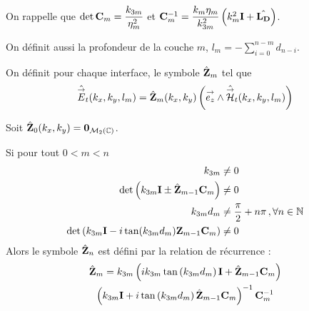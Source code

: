         On rappelle que \(\det{\mathbf{C}_m} = \dfrac{k_{3m}}{\eta_m^2}\) et \(\mathbf{C}_m^{-1}= \dfrac{k_m\eta_m}{k_{3m}^2}\left(k_m^2 \mathbf{I} + \hat{\mathbf{L_D}}\right)\).

        On définit aussi la profondeur de la couche \(m\), \(l_m = -\sum_{i=0}^{n-m} d_{n-i} \).

        \begin{defn}
            On définit pour chaque interface, le symbole \(\hat {\mathbf{Z}}_m\) tel que
            \begin{equation}
                \hat {{\overset{\rightarrow}{E}}}_t(k_x,k_y,l_m) = \hat {\mathbf{Z}}_m(k_x,k_y) \left({\overset{\rightarrow}{e_z}} \wedge \hat {{\overset{\rightarrow}{\mathcal{H}}}}_t(k_x,k_y,l_m)\right)
            \end{equation}
        \end{defn}

        \begin{thm}
            \label{thm:imp:fourier:plan:multi_couche}
            Soit \(\hat {\mathbf{Z}}_0(k_x,k_y) = \mathbf{0}_{\mathcal{M}_2(\mathbb C)}\).

            Si pour tout \(0<m < n\)
            \begin{align}
                k_{3m} &\not = 0 \\
                \det\left(k_{3m}\mathbf{I} \pm \hat {\mathbf{Z}}_{m-1}\mathbf{C}_m \right) &\not = 0 \\
                k_{3m}d_m &\not = \dfrac{\pi}{2}+n\pi\,, \forall n \in \mathbb N \\
                \det\left(k_{3m}\mathbf{I} - i\tan(k_{3m}d_m)\mathbf{Z}_{m-1}\mathbf{C}_m\right) &\not = 0
            \end{align}
            Alors le symbole \(\hat {\mathbf{Z}}_n\) est défini par la relation de récurrence :
            \begin{multline}
                \hat {\mathbf{Z}}_m = k_{3m}
                \left(ik_{3m}\tan\left(k_{3m}d_m\right)\mathbf{I} + \hat {\mathbf{Z}}_{m-1}\mathbf{C}_m\right) \\
                \left(k_{3m}\mathbf{I} + i\tan\left(k_{3m}d_m\right)\hat {\mathbf{Z}}_{m-1}\mathbf{C}_m\right)^{-1}
                \mathbf{C}_m^{-1}
            \end{multline}
        \end{thm}

